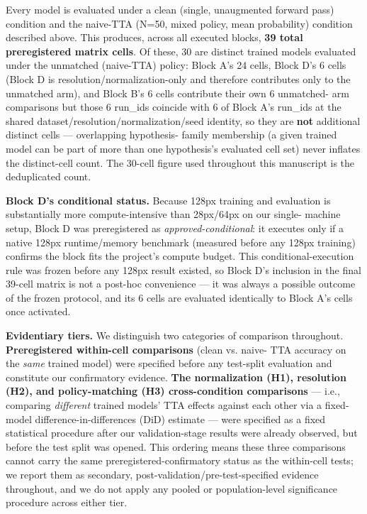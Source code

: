 Every model is evaluated under a clean (single, unaugmented forward pass) condition and the naive-TTA (N=50, mixed policy, mean probability) condition described above. This produces, across all executed blocks, \textbf{39 total preregistered matrix cells}. Of these, 30 are distinct trained models evaluated under the unmatched (naive-TTA) policy: Block A's 24 cells, Block D's 6 cells (Block D is resolution/normalization-only and therefore contributes only to the unmatched arm), and Block B's 6 cells contribute their own 6 unmatched- arm comparisons but those 6 run\_ids coincide with 6 of Block A's run\_ids at the shared dataset/resolution/normalization/seed identity, so they are \textbf{not} additional distinct cells --- overlapping hypothesis- family membership (a given trained model can be part of more than one hypothesis's evaluated cell set) never inflates the distinct-cell count. The 30-cell figure used throughout this manuscript is the deduplicated count.

\textbf{Block D's conditional status.} Because 128px training and evaluation is substantially more compute-intensive than 28px/64px on our single- machine setup, Block D was preregistered as \emph{approved-conditional}: it executes only if a native 128px runtime/memory benchmark (measured before any 128px training) confirms the block fits the project's compute budget. This conditional-execution rule was frozen before any 128px result existed, so Block D's inclusion in the final 39-cell matrix is not a post-hoc convenience --- it was always a possible outcome of the frozen protocol, and its 6 cells are evaluated identically to Block A's cells once activated.

\textbf{Evidentiary tiers.} We distinguish two categories of comparison throughout. \textbf{Preregistered within-cell comparisons} (clean vs. naive- TTA accuracy on the \emph{same} trained model) were specified before any test-split evaluation and constitute our confirmatory evidence. \textbf{The normalization (H1), resolution (H2), and policy-matching (H3) cross-condition comparisons} --- i.e., comparing \emph{different} trained models' TTA effects against each other via a fixed-model difference-in-differences (DiD) estimate --- were specified as a fixed statistical procedure after our validation-stage results were already observed, but before the test split was opened. This ordering means these three comparisons cannot carry the same preregistered-confirmatory status as the within-cell tests; we report them as secondary, post-validation/pre-test-specified evidence throughout, and we do not apply any pooled or population-level significance procedure across either tier.

